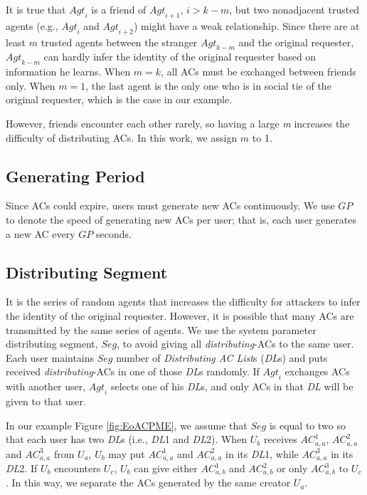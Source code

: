It is true that ${Agt}_i$ is a friend of ${Agt}_{i+1}$, $i>k-m$, but two nonadjacent trusted agents (e.g., ${Agt}_i$ and ${Agt}_{i+2}$) might have a weak relationship. Since there are at least $m$ trusted agents between the stranger ${Agt}_{k-m}$ and the original requester, ${Agt}_{k-m}$ can hardly infer the identity of the original requester based on information he learns. When $m=k$, all ACs must be exchanged between friends only. When $m=1$, the last agent is the only one who is in social tie of the original requester, which is the case in our example.

However, friends encounter each other rarely, so having a large \textit{m} increases the difficulty of distributing ACs. In this work, we assign $m$ to 1.

\subsection{Generating Period}

\noindent Since ACs could expire, users must generate new ACs continuously. We use $GP$ to denote the speed of generating new ACs per user; that is, each user generates a new AC every $GP$ seconds.



\subsection{Distributing Segment}\label{subsubsecDisSeg}

\noindent It is the series of random agents that increases the difficulty for attackers to infer the identity of the original requester. However, it is possible that many ACs are transmitted by the same series of agents. We use the system parameter distributing segment, $Seg$, to avoid giving all \textit{distributing}-ACs to the same user. Each user maintains $Seg$ number of \textit{Distributing AC List}s (\textit{DL}s) and puts received \textit{distributing}-ACs in one of those \textit{DL}s randomly. If ${Agt}_i$ exchanges ACs with another user, ${Agt}_i$ selects one of his \textit{DL}s, and only ACs in that \textit{DL} will be given to that user.

In our example Figure \ref{fig:EoACPME}, we assume that $Seg$ is equal to two so that each user has two \textit{DL}s (i.e., \textit{DL}1 and \textit{DL}2). When $U_b$ receives ${AC}^1_{a,a}$, ${AC}^2_{a,a}$ and ${AC}^3_{a,a}$ from $U_a$, $U_b$ may put ${AC}^1_{a,a}$ and ${AC}^2_{a,a}$ in its \textit{DL}1, while ${AC}^3_{a,a}$ in its \textit{DL}2. If $U_b$ encounters $U_c$, $U_b$ can give either ${AC}^1_{a,b}$ and ${AC}^2_{a,b}$ or only ${AC}^3_{a,b}$ to $U_c$. In this way, we separate the ACs generated by the same creator $U_a$.

